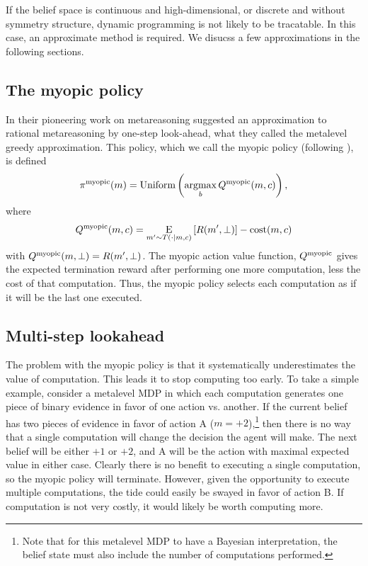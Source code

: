 If the belief space is continuous and high-dimensional, or discrete and without symmetry structure, dynamic programming is not likely to be tracatable. In this case, an approximate method is required. We disucss a few approximations in the following sections.

\subsection{The myopic policy}

In their pioneering work on metareasoning \citet{russell1991principles} suggested an approximation to rational metareasoning by one-step look-ahead, what they called the metalevel greedy approximation. This policy, which we call the myopic policy (following \citealp{hay2012selecting}), is defined
\begin{equation}
  \pi^{\mathrm{myopic}}(m) = \text{Uniform}\left(\operatorname*{argmax}_b Q^{\mathrm{myopic}}(m, c)\right),
\end{equation}
where
\begin{equation}
Q^{\mathrm{myopic}}(m, c) = \operatorname*{E}_{m' \sim T(\cdot \mid m, c)}\left[ 
  R(m', \bot)
\right] - \text{cost}(m, c)
\end{equation}
with $Q^{\mathrm{myopic}}(m, \bot) = R(m', \bot)$. The myopic action value function, $Q^{\mathrm{myopic}}$ gives the expected termination reward after performing one more computation, less the cost of that computation. Thus, the myopic policy selects each computation as if it will be the last one executed.

\subsection{Multi-step lookahead}

The problem with the myopic policy is that it systematically underestimates the value of computation. This leads it to stop computing too early. To take a simple example, consider a metalevel MDP in which each computation generates one piece of binary evidence in favor of one action vs. another. If the current belief has two pieces of evidence in favor of action A ($m = +2$),\footnote{Note that for this metalevel MDP to have a Bayesian interpretation, the belief state must also include the number of computations performed.} then there is no way that a single computation will change the decision the agent will make. The next belief will be either $+1$ or $+2$, and A will be the action with maximal expected value in either case. Clearly there is no benefit to executing a single computation, so the myopic policy will terminate. However, given the opportunity to execute multiple computations, the tide could easily be swayed in favor of action B. If computation is not very costly, it would likely be worth computing more.


